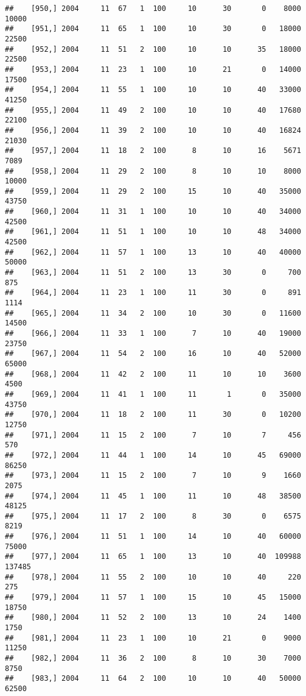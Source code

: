 \documentclass{article}\usepackage[]{graphicx}\usepackage[]{color}
\makeatletter
\newenvironment{kframe}{%
 \def\at@end@of@kframe{}%
 \ifinner\ifhmode%
  \def\at@end@of@kframe{\end{minipage}}%
  \begin{minipage}{\columnwidth}%
 \fi\fi%
 \def\FrameCommand##1{\hskip\@totalleftmargin \hskip-\fboxsep
 \colorbox{shadecolor}{##1}\hskip-\fboxsep
     \hskip-\linewidth \hskip-\@totalleftmargin \hskip\columnwidth}%
 \MakeFramed {\advance\hsize-\width
   \@totalleftmargin\z@ \linewidth\hsize
   \@setminipage}}%
 {\par\unskip\endMakeFramed%
 \at@end@of@kframe}
\newenvironment{knitrout}{}{} %
\makeatother
\begin{document}
\begin{knitrout}
\begin{kframe}
\begin{verbatim}
##    [950,] 2004     11  67   1  100     10      30       0    8000   10000
##    [951,] 2004     11  65   1  100     10      30       0   18000   22500
##    [952,] 2004     11  51   2  100     10      10      35   18000   22500
##    [953,] 2004     11  23   1  100     10      21       0   14000   17500
##    [954,] 2004     11  55   1  100     10      10      40   33000   41250
##    [955,] 2004     11  49   2  100     10      10      40   17680   22100
##    [956,] 2004     11  39   2  100     10      10      40   16824   21030
##    [957,] 2004     11  18   2  100      8      10      16    5671    7089
##    [958,] 2004     11  29   2  100      8      10      10    8000   10000
##    [959,] 2004     11  29   2  100     15      10      40   35000   43750
##    [960,] 2004     11  31   1  100     10      10      40   34000   42500
##    [961,] 2004     11  51   1  100     10      10      48   34000   42500
##    [962,] 2004     11  57   1  100     13      10      40   40000   50000
##    [963,] 2004     11  51   2  100     13      30       0     700     875
##    [964,] 2004     11  23   1  100     11      30       0     891    1114
##    [965,] 2004     11  34   2  100     10      30       0   11600   14500
##    [966,] 2004     11  33   1  100      7      10      40   19000   23750
##    [967,] 2004     11  54   2  100     16      10      40   52000   65000
##    [968,] 2004     11  42   2  100     11      10      10    3600    4500
##    [969,] 2004     11  41   1  100     11       1       0   35000   43750
##    [970,] 2004     11  18   2  100     11      30       0   10200   12750
##    [971,] 2004     11  15   2  100      7      10       7     456     570
##    [972,] 2004     11  44   1  100     14      10      45   69000   86250
##    [973,] 2004     11  15   2  100      7      10       9    1660    2075
##    [974,] 2004     11  45   1  100     11      10      48   38500   48125
##    [975,] 2004     11  17   2  100      8      30       0    6575    8219
##    [976,] 2004     11  51   1  100     14      10      40   60000   75000
##    [977,] 2004     11  65   1  100     13      10      40  109988  137485
##    [978,] 2004     11  55   2  100     10      10      40     220     275
##    [979,] 2004     11  57   1  100     15      10      45   15000   18750
##    [980,] 2004     11  52   2  100     13      10      24    1400    1750
##    [981,] 2004     11  23   1  100     10      21       0    9000   11250
##    [982,] 2004     11  36   2  100      8      10      30    7000    8750
##    [983,] 2004     11  64   2  100     10      10      40   50000   62500

\end{verbatim}
\end{kframe}
\end{knitrout}
\end{document}
